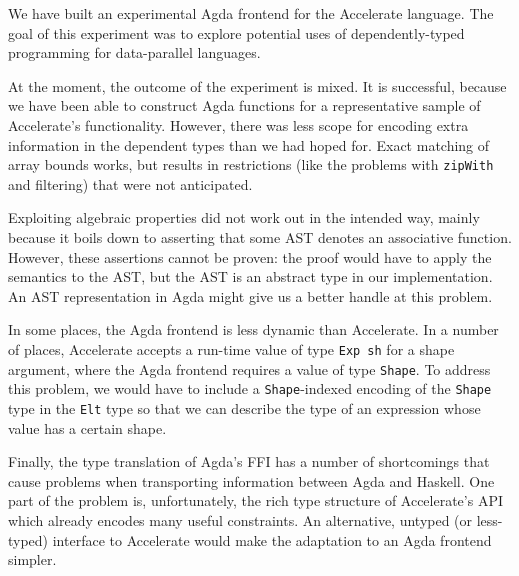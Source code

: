 \documentclass{llncs}
\begin{document}
We have built an experimental Agda frontend for the Accelerate
language. The goal of this experiment was to explore potential uses of
dependently-typed programming for data-parallel languages. 

At the moment, the outcome of the experiment is mixed. It is
successful, because we have been able to construct Agda functions for
a representative sample of Accelerate's functionality.
However, there was less scope for encoding extra information in the
dependent types than we had hoped for. Exact matching of array bounds
works, but results in restrictions (like the problems with
\texttt{zipWith} and filtering) that were not anticipated.

Exploiting algebraic properties did not work out in the intended way, mainly
because it boils down to asserting that some AST denotes an
associative function. However, these assertions cannot be proven: the
proof would have to apply the semantics to the AST, but the AST is an
abstract type in our implementation. An AST representation in Agda
might give us a better handle at this problem. 

In some places, the Agda frontend is less dynamic than Accelerate. In
a number of places, Accelerate accepts a run-time value of type
\texttt{Exp sh} for a shape argument, where the Agda frontend requires
a value of type \texttt{Shape}. To address this problem, we would have
to include a \texttt{Shape}-indexed encoding of the \texttt{Shape}
type in the \texttt{Elt} type so that we can describe the type of
an expression whose value has a certain shape. 

Finally, the type translation of Agda's FFI has a number of shortcomings that
cause problems when transporting information between Agda
and Haskell. One part of the problem is, unfortunately, the rich type
structure of Accelerate's API which already encodes many useful
constraints. An alternative, untyped (or less-typed) interface to
Accelerate would make the adaptation to an Agda frontend simpler.

%
%


\end{document}
